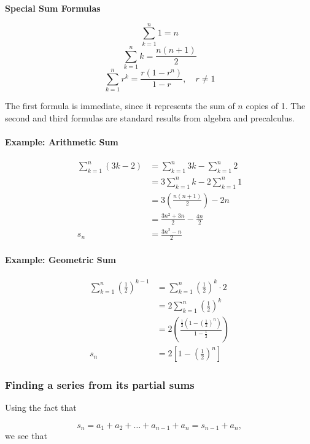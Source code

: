 \textbf{Special Sum Formulas}

\[
\sum_{k=1}^{n} 1 = n
\]
\[
\sum_{k=1}^{n} k = \frac{n(n+1)}{2}
\]
\[
\sum_{k=1}^{n} r^k = \frac{r(1 - r^n)}{1 - r}, \quad r \ne 1
\]

The first formula is immediate, since it represents the sum of $n$ copies of 1. 
The second and third formulas are standard results from algebra and precalculus.

\paragraph{Example: Arithmetic Sum}

\begin{align}
\sum_{k=1}^{n} (3k - 2)
&= \sum_{k=1}^{n} 3k - \sum_{k=1}^{n} 2 \\
&= 3 \sum_{k=1}^{n} k - 2 \sum_{k=1}^{n} 1 \\
&= 3\left(\frac{n(n+1)}{2}\right) - 2n \\
&= \frac{3n^2 + 3n}{2} - \frac{4n}{2} \\
s_n &= \frac{3n^2 - n}{2}
\end{align}

\paragraph{Example: Geometric Sum}

\begin{align}
\sum_{k=1}^{n} \left(\tfrac{1}{2}\right)^{k-1}
&= \sum_{k=1}^{n} \left(\tfrac{1}{2}\right)^k \cdot 2 \\
&= 2 \sum_{k=1}^{n} \left(\tfrac{1}{2}\right)^k \\
&= 2 \left( \frac{\frac{1}{2}\left(1 - \left(\tfrac{1}{2}\right)^n\right)}{1 - \tfrac{1}{2}} \right) \\
s_n &= 2\left[1 - \left(\tfrac{1}{2}\right)^n\right]
\end{align}


\subsubsection{Finding a series from its partial sums}
\label{sss:find-5833}


Using the fact that


\[
s_n=a_1+a_2+\ldots+a _{n-1}+a_n=s _{n-1}+a_n,
\] we see that


